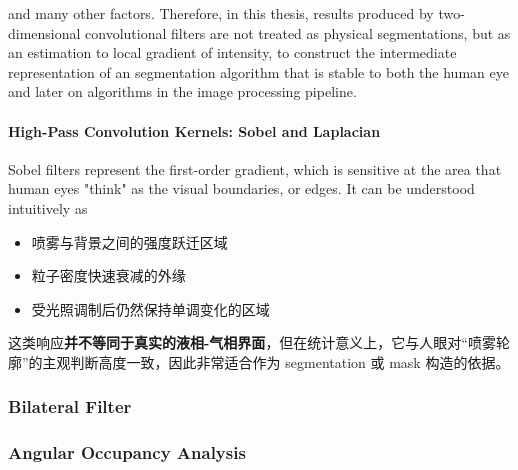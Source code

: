 \documentclass[english, 12pt, a4paper, elec, utf8, a-2b, online]{aaltothesis}
\begin{document}
and many other factors. Therefore, in this thesis, results produced by two-dimensional convolutional filters are not treated as physical segmentations, but as an estimation to local gradient of intensity, to construct the intermediate representation of an segmentation algorithm that is stable to both the human eye and later on algorithms in the image processing pipeline.\\

\paragraph{High-Pass Convolution Kernels: Sobel and Laplacian}







Sobel filters represent the first-order gradient, which is sensitive at the area that human eyes "think" as the visual boundaries, or edges. It can be understood intuitively as 


\begin{itemize}
    \item 喷雾与背景之间的强度跃迁区域
    \item 粒子密度快速衰减的外缘
    \item 受光照调制后仍然保持单调变化的区域
\end{itemize}
这类响应\textbf{并不等同于真实的液相-气相界面}，但在统计意义上，它与人眼对“喷雾轮廓”的主观判断高度一致，因此非常适合作为 segmentation 或 mask 构造的依据。

 


\subsubsection{Bilateral Filter}
\subsubsection{Angular Occupancy Analysis}
\end{document}
